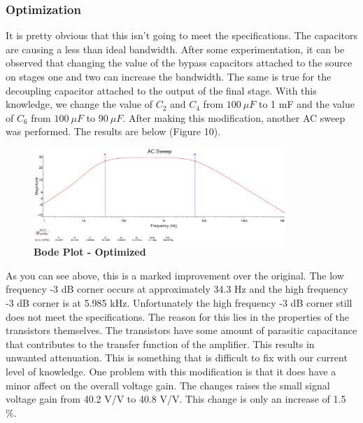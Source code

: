 \documentclass{article}
\begin{document}
	\subsubsection{Optimization}
	It is pretty obvious that this isn't going to meet the specifications. The capacitors are causing a less than ideal bandwidth. After some experimentation, it can be observed that changing the value of the bypass capacitors attached to the source on stages one and two  can increase the bandwidth. The same is true for the decoupling capacitor attached to the output of the final stage. With this knowledge, we change the value of $C_2$ and $C_4$ from $100\ \mu F$ to 1 mF and the value of $C_6$ from $100\ \mu F$ to $90\ \mu F$. After making this modification, another AC sweep was performed. The results are below (Figure 10).
    \begin{figure}[H]
        \centerline{\includegraphics[width=0.85\textwidth]{bode_opt_img}}
        \caption{\textbf{Bode Plot - Optimized}}
	\end{figure}
	As you can see above, this is a marked improvement over the original. The low frequency -3 dB corner occurs at approximately 34.3 Hz and the high frequency -3 dB corner is at 5.985 kHz. Unfortunately the high frequency -3 dB corner still does not meet the specifications. The reason for this lies in the properties of the transistors themselves. The transistors have some amount of parasitic capacitance that contributes to the transfer function of the amplifier. This results in unwanted attenuation. This is something that is difficult to fix with our current level of knowledge. One problem with this modification is that it does have a minor affect on the overall voltage gain. The changes raises the small signal voltage gain from 40.2 V/V to 40.8 V/V. This change is only an increase of 1.5 \%. 
\end{document}
